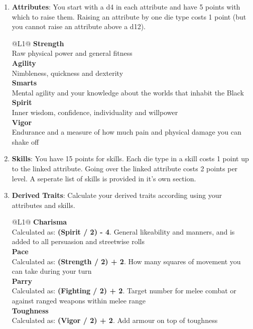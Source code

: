 \begin{enumerate}
  \item \textbf{Attributes}: You start with a d4 in each attribute and have 5 points with which to raise them. Raising an attribute by one die type costs 1 point (but you cannot raise an attribute above a d12).
    \begin{standardtable}{\linewidth}{@{}L{1}@{}}
      \textbf{Strength}\\
      Raw physical power and general fitness\\
      \textbf{Agility}\\
      Nimbleness, quickness and dexterity\\
      \textbf{Smarts}\\
      Mental agility and your knowledge about the worlds that inhabit the Black\\
      \textbf{Spirit}\\
      Inner wisdom, confidence, individuality and willpower\\
      \textbf{Vigor}\\
      Endurance and a measure of how much pain and physical damage you can shake off
    \end{standardtable}

  \item \textbf{Skills}: You have 15 points for skills. Each die type in a skill costs 1 point up to the linked attribute. Going over the linked attribute costs 2 points per level. A seperate list of skills is provided in it's own section.

  \item \textbf{Derived Traits}: Calculate your derived traits according using your attributes and skills.
    \begin{standardtable}{\linewidth}{@{}L{1}@{}}
      \textbf{Charisma}\\
      Calculated as: \textbf{(Spirit / 2) - 4}. General likeability and manners, and is added to all persuasion and streetwise rolls\\
      \textbf{Pace}\\
      Calculated as: \textbf{(Strength / 2) + 2}. How many squares of movement you can take during your turn\\
      \textbf{Parry}\\
      Calculated as: \textbf{(Fighting / 2) + 2}. Target number for melee combat or against ranged weapons within melee range\\
      \textbf{Toughness}\\
      Calculated as: \textbf{(Vigor / 2) + 2}. Add armour on top of toughness\\
    \end{standardtable}


\end{enumerate}
